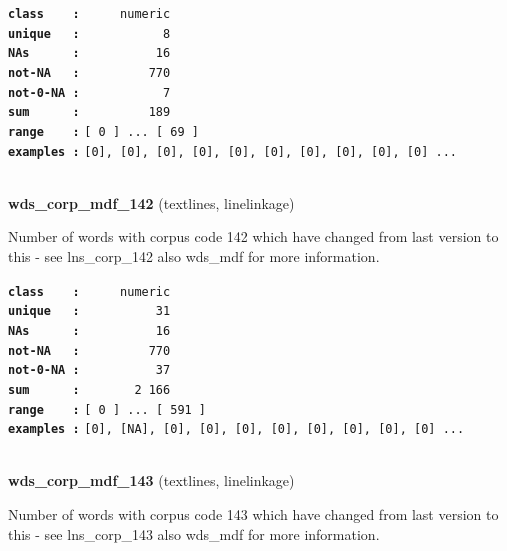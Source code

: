 \documentclass[]{article}
\begin{document}
\textbf{\texttt{class\ \ \ \ :}} \texttt{~~~~~numeric}\\
\textbf{\texttt{unique\ \ \ :}} \texttt{~~~~~~~~~~~8}\\
\textbf{\texttt{NAs\ \ \ \ \ \ :}} \texttt{~~~~~~~~~~16}\\
\textbf{\texttt{not-NA\ \ \ :}} \texttt{~~~~~~~~~770}\\
\textbf{\texttt{not-0-NA\ :}} \texttt{~~~~~~~~~~~7}\\
\textbf{\texttt{sum\ \ \ \ \ \ :}} \texttt{~~~~~~~~~189}\\
\textbf{\texttt{range\ \ \ \ :}}
\texttt{{[}\ 0\ {]}\ ...\ {[}\ 69\ {]}}\\
\textbf{\texttt{examples\ :}}
\texttt{{[}0{]},\ {[}0{]},\ {[}0{]},\ {[}0{]},\ {[}0{]},\ {[}0{]},\ {[}0{]},\ {[}0{]},\ {[}0{]},\ {[}0{]}\ ...}\\

~

\textbf{wds\_corp\_mdf\_142} (textlines, linelinkage)

Number of words with corpus code 142 which have changed from last
version to this - see lns\_corp\_142 also wds\_mdf for more information.

\textbf{\texttt{class\ \ \ \ :}} \texttt{~~~~~numeric}\\
\textbf{\texttt{unique\ \ \ :}} \texttt{~~~~~~~~~~31}\\
\textbf{\texttt{NAs\ \ \ \ \ \ :}} \texttt{~~~~~~~~~~16}\\
\textbf{\texttt{not-NA\ \ \ :}} \texttt{~~~~~~~~~770}\\
\textbf{\texttt{not-0-NA\ :}} \texttt{~~~~~~~~~~37}\\
\textbf{\texttt{sum\ \ \ \ \ \ :}} \texttt{~~~~~~~2~166}\\
\textbf{\texttt{range\ \ \ \ :}}
\texttt{{[}\ 0\ {]}\ ...\ {[}\ 591\ {]}}\\
\textbf{\texttt{examples\ :}}
\texttt{{[}0{]},\ {[}NA{]},\ {[}0{]},\ {[}0{]},\ {[}0{]},\ {[}0{]},\ {[}0{]},\ {[}0{]},\ {[}0{]},\ {[}0{]}\ ...}\\

~

\textbf{wds\_corp\_mdf\_143} (textlines, linelinkage)

Number of words with corpus code 143 which have changed from last
version to this - see lns\_corp\_143 also wds\_mdf for more information.
\end{document}
